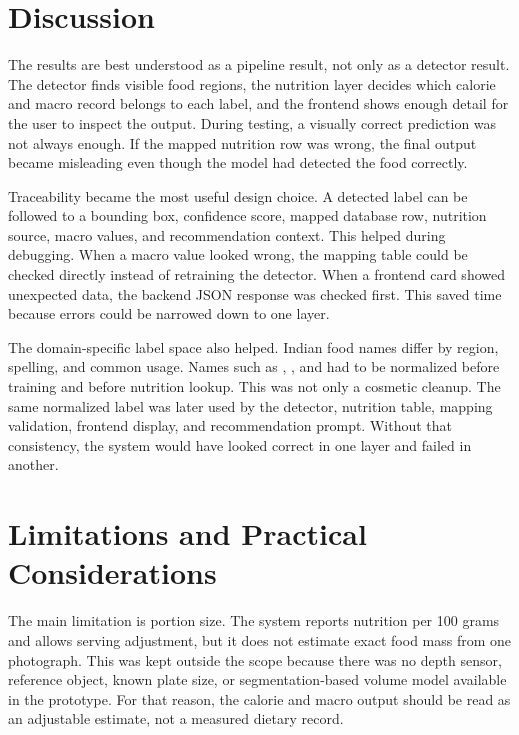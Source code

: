 
\section{Discussion}

The results are best understood as a pipeline result, not only as a detector result. The detector finds visible food regions, the nutrition layer decides which calorie and macro record belongs to each label, and the frontend shows enough detail for the user to inspect the output. During testing, a visually correct prediction was not always enough. If the mapped nutrition row was wrong, the final output became misleading even though the model had detected the food correctly.

Traceability became the most useful design choice. A detected label can be followed to a bounding box, confidence score, mapped database row, nutrition source, macro values, and recommendation context. This helped during debugging. When a macro value looked wrong, the mapping table could be checked directly instead of retraining the detector. When a frontend card showed unexpected data, the backend JSON response was checked first. This saved time because errors could be narrowed down to one layer.

The domain-specific label space also helped. Indian food names differ by region, spelling, and common usage. Names such as , , and  had to be normalized before training and before nutrition lookup. This was not only a cosmetic cleanup. The same normalized label was later used by the detector, nutrition table, mapping validation, frontend display, and recommendation prompt. Without that consistency, the system would have looked correct in one layer and failed in another.

\section{Limitations and Practical Considerations}

The main limitation is portion size. The system reports nutrition per 100 grams and allows serving adjustment, but it does not estimate exact food mass from one photograph. This was kept outside the scope because there was no depth sensor, reference object, known plate size, or segmentation-based volume model available in the prototype. For that reason, the calorie and macro output should be read as an adjustable estimate, not a measured dietary record.

